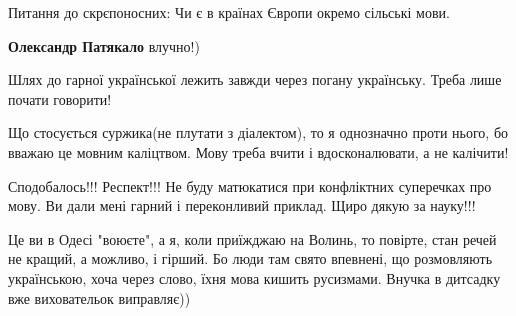 \begin{itemize}
 
Питання до скрєпоносних: Чи є в країнах Європи окремо сільські мови.

\begin{itemize}
 
\textbf{Олександр Патякало} влучно!)
\end{itemize}

 

Шлях до гарної української лежить завжди через погану українську. Треба лише
почати говорити!

Що стосується суржика(не плутати з діалектом), то я однозначно проти нього, бо
вважаю це мовним каліцтвом. Мову треба вчити і вдосконалювати, а не калічити!


 

Сподобалось!!! Респект!!! Не буду матюкатися при конфліктних суперечках про
мову. Ви дали мені гарний і переконливий приклад. Щиро дякую за науку!!!


 

Це ви в Одесі "воюєте", а я, коли приїжджаю на Волинь, то повірте, стан речей
не кращий, а можливо, і гірший. Бо люди там свято впевнені, що розмовляють
українською, хоча через слово, їхня мова кишить русизмами. Внучка в дитсадку
вже виховательок виправляє))

\end{itemize}

